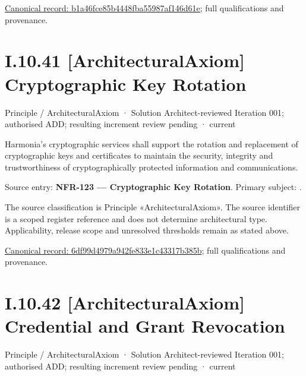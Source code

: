 {\footnotesize \href{../../../../../../../continuum/motivation/principle/b1a46fce85b4448fba55987af146d61e.md}{Canonical record: b1a46fce85b4448fba55987af146d61e}; full qualifications and provenance.}\par
\section*{I.10.41 [ArchitecturalAxiom] Cryptographic Key Rotation}
\label{navigation:I.10.41}

\label{element:6df99d4979a942fe833e1c43317b385b}
{\small Principle / ArchitecturalAxiom · Solution Architect-reviewed Iteration 001; authorised ADD; resulting increment review pending · current}\par

Harmonia's cryptographic services shall support the rotation and replacement of cryptographic keys and certificates to maintain the security, integrity and trustworthiness of cryptographically protected information and communications.



Source entry: \textbf{NFR-123 — Cryptographic Key Rotation}. Primary subject: \texttt{}.



The source classification is Principle «ArchitecturalAxiom». The source identifier is a scoped register reference and does not determine architectural type. Applicability, release scope and unresolved thresholds remain as stated above.


{\footnotesize \href{../../../../../../../continuum/motivation/principle/architectural-axiom/6df99d4979a942fe833e1c43317b385b.md}{Canonical record: 6df99d4979a942fe833e1c43317b385b}; full qualifications and provenance.}\par
\section*{I.10.42 [ArchitecturalAxiom] Credential and Grant Revocation}
\label{navigation:I.10.42}

\label{element:370d9a6e0e00402aba9720580a2e365e}
{\small Principle / ArchitecturalAxiom · Solution Architect-reviewed Iteration 001; authorised ADD; resulting increment review pending · current}\par

